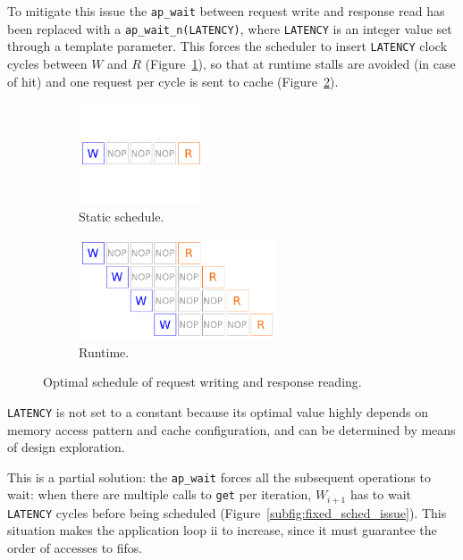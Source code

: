 \documentclass[11pt,a4paper,oneside]{memoir}
\begin{document}
\bigskip
To mitigate this issue the \texttt{ap\_wait} between request write and response
read has been replaced with a \texttt{ap\_wait\_n(LATENCY)}, where
\texttt{LATENCY} is an integer value set through a template parameter.  This
forces the scheduler to insert \texttt{LATENCY} clock cycles between $W$ and
$R$ (Figure~\ref{subfig:desired_sched_static}), so that at runtime stalls are
avoided (in case of hit) and one request per cycle is sent to cache
(Figure~\ref{subfig:desired_sched_run}).

\begin{figure}[!htb]
	\centering
	\begin{subfigure}[b]{.3\textwidth}
		\centering
		\includegraphics[height=3cm]{desired_schedule_static}
		\caption{Static schedule.}
		\label{subfig:desired_sched_static}
	\end{subfigure}
	\hfill
	\begin{subfigure}[b]{.68\textwidth}
		\centering
		\includegraphics[height=3cm]{desired_schedule_run}
		\caption{Runtime.}
		\label{subfig:desired_sched_run}
	\end{subfigure}
	\caption{Optimal schedule of request writing and response reading.}
	\label{fig:desired_sched}
\end{figure}

\texttt{LATENCY} is not set to a constant because its optimal value highly
depends on memory access pattern and cache configuration, and can be determined
by means of design exploration.

This is a partial solution: the \texttt{ap\_wait} forces all the subsequent
operations to wait: when there are multiple calls to \texttt{get} per
iteration, $W_{i+1}$ has to wait \texttt{LATENCY} cycles before being
scheduled (Figure~\ref{subfig:fixed_sched_issue}).
This situation makes the application loop \ac{ii} to increase, since it must
guarantee the order of accesses to \acp{fifo}.
\end{document}

